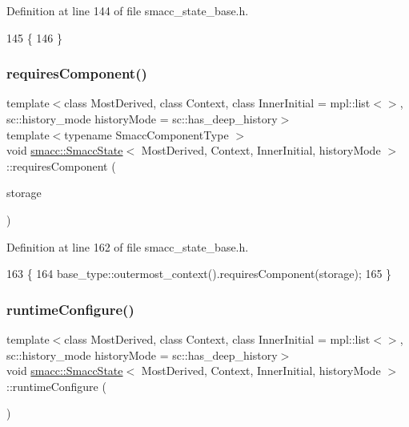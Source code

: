 Definition at line 144 of file smacc\+\_\+state\+\_\+base.\+h.


\begin{DoxyCode}
145     \{
146     \}
\end{DoxyCode}
\mbox{\label{classsmacc_1_1SmaccState_a2febb778d5c3d80b9c034576b5a92b65}} 
\subsubsection{\texorpdfstring{requires\+Component()}{requiresComponent()}}
{\footnotesize\ttfamily template$<$class Most\+Derived, class Context, class Inner\+Initial = mpl\+::list$<$$>$, sc\+::history\+\_\+mode history\+Mode = sc\+::has\+\_\+deep\+\_\+history$>$ \\
template$<$typename Smacc\+Component\+Type $>$ \\
void \hyperlink{classsmacc_1_1SmaccState}{smacc\+::\+Smacc\+State}$<$ Most\+Derived, Context, Inner\+Initial, history\+Mode $>$\+::requires\+Component (\begin{DoxyParamCaption}\item[{Smacc\+Component\+Type $\ast$\&}]{storage }\end{DoxyParamCaption})\hspace{0.3cm}{\ttfamily [inline]}}



Definition at line 162 of file smacc\+\_\+state\+\_\+base.\+h.


\begin{DoxyCode}
163     \{
164       base\_type::outermost\_context().requiresComponent(storage);
165     \}
\end{DoxyCode}
\mbox{\label{classsmacc_1_1SmaccState_a6995704a0232e24f4c38250302c0a01f}} 
\subsubsection{\texorpdfstring{runtime\+Configure()}{runtimeConfigure()}}
{\footnotesize\ttfamily template$<$class Most\+Derived, class Context, class Inner\+Initial = mpl\+::list$<$$>$, sc\+::history\+\_\+mode history\+Mode = sc\+::has\+\_\+deep\+\_\+history$>$ \\
void \hyperlink{classsmacc_1_1SmaccState}{smacc\+::\+Smacc\+State}$<$ Most\+Derived, Context, Inner\+Initial, history\+Mode $>$\+::runtime\+Configure (\begin{DoxyParamCaption}{ }\end{DoxyParamCaption})\hspace{0.3cm}{\ttfamily [inline]}}



